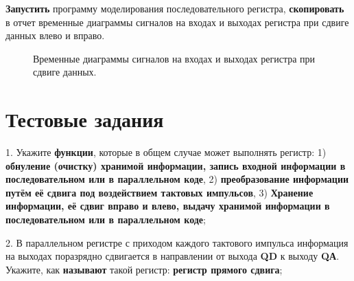 \documentclass[spec, och, otchet, hidelinks]{SCWorks}
\begin{document}
\par \textbf{Запустить} программу моделирования последовательного регистра, \textbf{скопировать} в отчет временные диаграммы сигналов на входах и выходах 
регистра при сдвиге данных влево и вправо.

\begin{figure}[h]
	\caption{Временные диаграммы сигналов на входах и выходах регистра при сдвиге данных.}
\end{figure}

\newpage

\section*{Тестовые задания}

\par 1. Укажите \textbf{функции}, которые в общем случае может выполнять регистр: 1) \textbf{обнуление (очистку) хранимой информации, запись входной 
	информации в последовательном или в параллельном коде}, 2) \textbf{преобразование информации путём её сдвига под воздействием тактовых импульсов}, 
3) \textbf{Хранение информации, её сдвиг вправо и влево, выдачу хранимой информации в последовательном или в параллельном коде};
\par 2. В параллельном регистре с приходом каждого тактового импульса информация на выходах поразрядно сдвигается в направлении от выхода \textbf{QD} 
к выходу \textbf{QА}. Укажите, как \textbf{называют} такой регистр: \textbf{регистр прямого сдвига};
\end{document}
